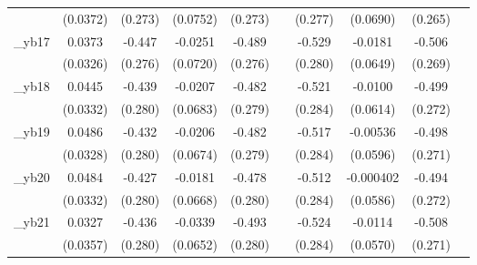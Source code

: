 \begin{table}[htbp]
\begin{tabular}{l*{9}{c}}
            &    (0.0372)         &     (0.273)         &    (0.0752)         &     (0.273)         &                     &     (0.277)         &    (0.0690)         &     (0.265)         &                     \\
[1em]
\_yb17       &      0.0373         &      -0.447         &     -0.0251         &      -0.489\sym{*}  &                     &      -0.529\sym{*}  &     -0.0181         &      -0.506\sym{*}  &                     \\
            &    (0.0326)         &     (0.276)         &    (0.0720)         &     (0.276)         &                     &     (0.280)         &    (0.0649)         &     (0.269)         &                     \\
[1em]
\_yb18       &      0.0445         &      -0.439         &     -0.0207         &      -0.482\sym{*}  &                     &      -0.521\sym{*}  &     -0.0100         &      -0.499\sym{*}  &                     \\
            &    (0.0332)         &     (0.280)         &    (0.0683)         &     (0.279)         &                     &     (0.284)         &    (0.0614)         &     (0.272)         &                     \\
[1em]
\_yb19       &      0.0486         &      -0.432         &     -0.0206         &      -0.482\sym{*}  &                     &      -0.517\sym{*}  &    -0.00536         &      -0.498\sym{*}  &                     \\
            &    (0.0328)         &     (0.280)         &    (0.0674)         &     (0.279)         &                     &     (0.284)         &    (0.0596)         &     (0.271)         &                     \\
[1em]
\_yb20       &      0.0484         &      -0.427         &     -0.0181         &      -0.478\sym{*}  &                     &      -0.512\sym{*}  &   -0.000402         &      -0.494\sym{*}  &                     \\
            &    (0.0332)         &     (0.280)         &    (0.0668)         &     (0.280)         &                     &     (0.284)         &    (0.0586)         &     (0.272)         &                     \\
[1em]
\_yb21       &      0.0327         &      -0.436         &     -0.0339         &      -0.493\sym{*}  &                     &      -0.524\sym{*}  &     -0.0114         &      -0.508\sym{*}  &                     \\
            &    (0.0357)         &     (0.280)         &    (0.0652)         &     (0.280)         &                     &     (0.284)         &    (0.0570)         &     (0.271)         &                     \\

\end{tabular}
\end{table}
